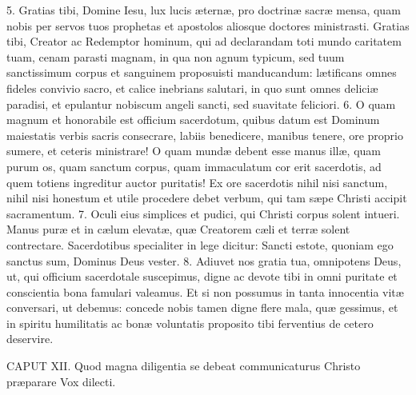 5. Gratias tibi, Domine Iesu, lux lucis æternæ, pro doctrinæ sacræ mensa, quam nobis per servos tuos prophetas et apostolos aliosque doctores ministrasti. Gratias tibi, Creator ac Redemptor hominum, qui ad declarandam toti mundo caritatem tuam, cenam parasti magnam, in qua non agnum typicum, sed tuum sanctissimum corpus et sanguinem proposuisti manducandum: lætificans omnes fideles convivio sacro, et calice inebrians salutari, in quo sunt omnes deliciæ paradisi, et epulantur nobiscum angeli sancti, sed suavitate feliciori.
6. O quam magnum et honorabile est officium sacerdotum, quibus datum est Dominum maiestatis verbis sacris consecrare, labiis benedicere, manibus tenere, ore proprio sumere, et ceteris ministrare! O quam mundæ debent esse manus illæ, quam purum os, quam sanctum corpus, quam immaculatum cor erit sacerdotis, ad quem totiens ingreditur auctor puritatis! Ex ore sacerdotis nihil nisi sanctum, nihil nisi honestum et utile procedere debet verbum, qui tam sæpe Christi accipit sacramentum.
7. Oculi eius simplices et pudici, qui Christi corpus solent intueri. Manus puræ et in cælum elevatæ, quæ Creatorem cæli et terræ solent contrectare. Sacerdotibus specialiter in lege dicitur: Sancti estote, quoniam ego sanctus sum, Dominus Deus vester.
8. Adiuvet nos gratia tua, omnipotens Deus, ut, qui officium sacerdotale suscepimus, digne ac devote tibi in omni puritate et conscientia bona famulari valeamus. Et si non possumus in tanta innocentia vitæ conversari, ut debemus: concede nobis tamen digne flere mala, quæ gessimus, et in spiritu humilitatis ac bonæ voluntatis proposito tibi ferventius de cetero deservire.


CAPUT XII.
Quod magna diligentia se debeat communicaturus Christo præparare
Vox dilecti.

